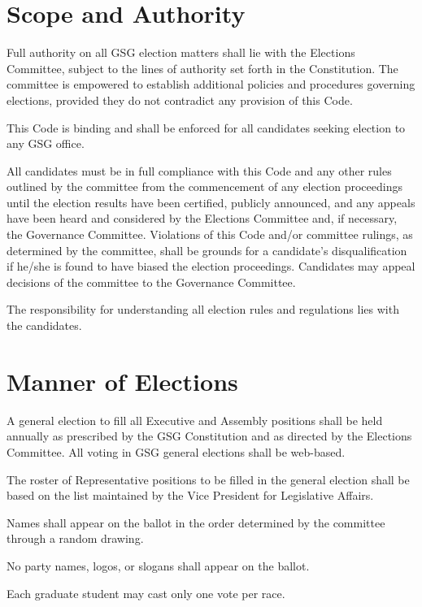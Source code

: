 \section{Scope and Authority}
\begin{bylaws-number}
  \item Full authority on all GSG election matters shall lie with the Elections Committee, subject to the lines of authority set forth in the Constitution. The committee is empowered to establish additional policies and procedures governing elections, provided they do not contradict any provision of this Code.
  \item This Code is binding and shall be enforced for all candidates seeking election to any GSG office.
  \item All candidates must be in full compliance with this Code and any other rules outlined by the committee from the commencement of any election proceedings until the election results have been certified, publicly announced, and any appeals have been heard and considered by the Elections Committee and, if necessary, the Governance Committee. Violations of this Code and/or committee rulings, as determined by the committee, shall be grounds for a candidate’s disqualification if he/she is found to have biased the election proceedings. Candidates may appeal decisions of the committee to the Governance Committee.
  \item The responsibility for understanding all election rules and regulations lies with the candidates.
\end{bylaws-number}

\section{Manner of Elections}
\begin{bylaws-number}
  \item A general election to fill all Executive and Assembly positions shall be held annually as prescribed by the GSG Constitution and as directed by the Elections Committee. All voting in GSG general elections shall be web-based.
  \item The roster of Representative positions to be filled in the general election shall be based on the list maintained by the Vice President for Legislative Affairs.
  \item Names shall appear on the ballot in the order determined by the committee through a random drawing.
  \item No party names, logos, or slogans shall appear on the ballot.
  \item Each graduate student may cast only one vote per race.
\end{bylaws-number}

